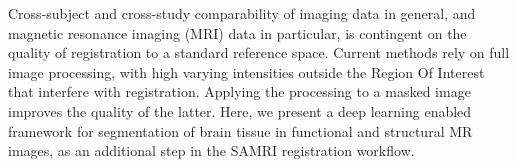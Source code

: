 Cross-subject and cross-study comparability of imaging data in general, and magnetic resonance imaging (MRI) data in particular, is contingent on the quality of registration to a standard reference space.
Current methods rely on full image processing, with high varying intensities outside the Region Of Interest that interfere with registration.
Applying the processing to a masked image improves the quality of the latter.
Here, we present a deep learning enabled framework for segmentation of brain tissue in functional and structural MR images, as an additional step in the SAMRI registration workflow.



